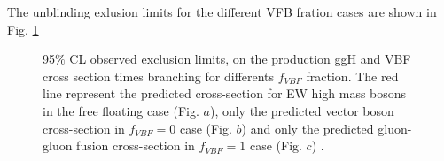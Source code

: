 The unblinding exlusion limits for the different VFB fration cases are shown in Fig.  \ref{fig:sig_OFSF_comb_un_VBF} 


\begin{figure}[htb]
\centering



\caption{95$\%$ CL observed exclusion limits,  on the production ggH and VBF cross section times branching for differents $f_{VBF}$ fraction.  The red  line represent the predicted cross-section for EW high mass bosons in  the free floating case (Fig. $a$), only the predicted vector boson cross-section in $f_{VBF}=0$ case (Fig. $b$) and only the predicted gluon-gluon fusion cross-section in $f_{VBF}=1$ case (Fig. $c$)  .}    
\label{fig:sig_OFSF_comb_un_VBF}

   \end{figure}

